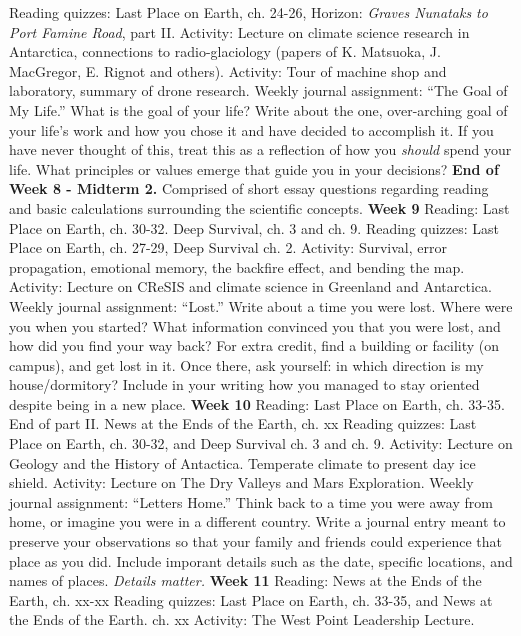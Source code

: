 \documentclass[10pt]{article}
\begin{document}
\begin{outline}[enumerate]
\2 Reading quizzes: Last Place on Earth, ch. 24-26, Horizon: \textit{Graves Nunataks to Port Famine Road}, part II.
\2 Activity: Lecture on climate science research in Antarctica, connections to radio-glaciology (papers of K. Matsuoka, J. MacGregor, E. Rignot and others).
\2 Activity: Tour of machine shop and laboratory, summary of drone research.
\2 Weekly journal assignment: ``The Goal of My Life.'' What is the goal of your life?  Write about the one, over-arching goal of your life's work and how you chose it and have decided to accomplish it.  If you have never thought of this, treat this as a reflection of how you \textit{should} spend your life.  What principles or values emerge that guide you in your decisions?
\1 \textbf{End of Week 8 - Midterm 2.} Comprised of short essay questions regarding reading and basic calculations surrounding the scientific concepts.
\1 \textbf{Week 9}
\2 Reading: Last Place on Earth, ch. 30-32. Deep Survival, ch. 3 and ch. 9.
\2 Reading quizzes: Last Place on Earth, ch. 27-29, Deep Survival ch. 2.
\2 Activity: Survival, error propagation, emotional memory, the backfire effect, and bending the map.
\2 Activity: Lecture on CReSIS and climate science in Greenland and Antarctica.
\2 Weekly journal assignment: ``Lost.'' Write about a time you were lost.  Where were you when you started?  What information convinced you that you were lost, and how did you find your way back?  For extra credit, find a building or facility (on campus), and get lost in it.  Once there, ask yourself: in which direction is my house/dormitory?  Include in your writing how you managed to stay oriented despite being in a new place.
\1 \textbf{Week 10}
\2 Reading: Last Place on Earth, ch. 33-35. End of part II.  News at the Ends of the Earth, ch. xx
\2 Reading quizzes: Last Place on Earth, ch. 30-32, and Deep Survival ch. 3 and ch. 9.
\2 Activity: Lecture on Geology and the History of Antactica.  Temperate climate to present day ice shield.
\2 Activity: Lecture on The Dry Valleys and Mars Exploration.
\2 Weekly journal assignment: ``Letters Home.'' Think back to a time you were away from home, or imagine you were in a different country.  Write a journal entry meant to preserve your observations so that your family and friends could experience that place as you did.  Include imporant details such as the date, specific locations, and names of places.  \textit{Details matter.}
\1 \textbf{Week 11}
\2 Reading:  News at the Ends of the Earth, ch. xx-xx
\2 Reading quizzes: Last Place on Earth, ch. 33-35, and News at the Ends of the Earth. ch. xx
\2 Activity: The West Point Leadership Lecture.

\end{outline}
\end{document}

